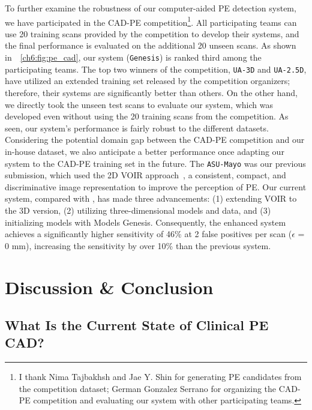 To further examine the robustness of our computer-aided PE detection system, we have participated in the CAD-PE competition\footnote{I thank Nima Tajbakhsh and Jae Y. Shin for generating PE candidates from the competition dataset; German Gonzalez Serrano for organizing the CAD-PE competition and evaluating our system with other participating teams.}. All participating teams can use 20 training scans provided by the competition to develop their systems, and the final performance is evaluated on the additional 20 unseen scans. As shown in~\figureautorefname~\ref{ch6:fig:pe_cad}, our system (\texttt{Genesis}) is ranked third among the participating teams. The top two winners of the competition, \texttt{UA-3D} and \texttt{UA-2.5D}, have utilized an extended training set released by the competition organizers; therefore, their systems are significantly better than others. On the other hand, we directly took the unseen test scans to evaluate our system, which was developed even without using the 20 training scans from the competition. As seen, our system's performance is fairly robust to the different datasets. Considering the potential domain gap between the CAD-PE competition and our in-house dataset, we also anticipate a better performance once adapting our system to the CAD-PE training set in the future. The \texttt{ASU-Mayo} was our previous submission, which used the 2D VOIR approach~\citep{tajbakhsh2019computer}, a consistent, compact, and discriminative image representation to improve the perception of PE. Our current system, compared with \citet{tajbakhsh2019computer}, has made three advancements: (1) extending VOIR to the 3D version, (2) utilizing three-dimensional models and data, and (3) initializing models with Models Genesis. Consequently, the enhanced system achieves a significantly higher sensitivity of 46\% at 2 false positives per scan ($\epsilon$ = 0 mm), increasing the sensitivity by over 10\% than the previous system.


\section{Discussion \& Conclusion}
\label{ch6:discussion}

\subsection{What Is the Current State of Clinical PE CAD?}
\label{ch6:discussion:current_state_of_pe_cad}

